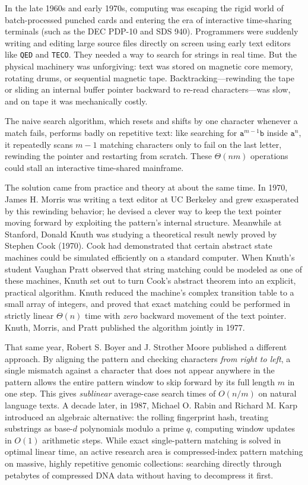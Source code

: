 \begin{historybox}
In the late 1960s and early 1970s, computing was escaping the rigid world of batch-processed punched cards and entering the era of interactive time-sharing terminals (such as the DEC PDP-10 and SDS 940). Programmers were suddenly writing and editing large source files directly on screen using early text editors like \texttt{QED} and \texttt{TECO}. They needed a way to search for strings in real time. But the physical machinery was unforgiving: text was stored on magnetic core memory, rotating drums, or sequential magnetic tape. Backtracking---rewinding the tape or sliding an internal buffer pointer backward to re-read characters---was slow, and on tape it was mechanically costly.

The naive search algorithm, which resets and shifts by one character whenever a match fails, performs badly on repetitive text: like searching for $\texttt{a}^{m-1}\texttt{b}$ inside $\texttt{a}^n$, it repeatedly scans $m-1$ matching characters only to fail on the last letter, rewinding the pointer and restarting from scratch. These $\Theta(n m)$ operations could stall an interactive time-shared mainframe.

The solution came from practice and theory at about the same time. In 1970, James H. Morris was writing a text editor at UC Berkeley and grew exasperated by this rewinding behavior; he devised a clever way to keep the text pointer moving forward by exploiting the pattern's internal structure. Meanwhile at Stanford, Donald Knuth was studying a theoretical result newly proved by Stephen Cook (1970). Cook had demonstrated that certain abstract state machines could be simulated efficiently on a standard computer. When Knuth's student Vaughan Pratt observed that string matching could be modeled as one of these machines, Knuth set out to turn Cook's abstract theorem into an explicit, practical algorithm. Knuth reduced the machine's complex transition table to a small array of integers, and proved that exact matching could be performed in strictly linear $\Theta(n)$ time with \emph{zero} backward movement of the text pointer. Knuth, Morris, and Pratt published the algorithm jointly in 1977.

That same year, Robert S. Boyer and J. Strother Moore published a different approach. By aligning the pattern and checking characters \emph{from right to left}, a single mismatch against a character that does not appear anywhere in the pattern allows the entire pattern window to skip forward by its full length $m$ in one step. This gives \emph{sublinear} average-case search times of $O(n/m)$ on natural language texts. A decade later, in 1987, Michael O. Rabin and Richard M. Karp introduced an algebraic alternative: the rolling fingerprint hash, treating substrings as base-$d$ polynomials modulo a prime $q$, computing window updates in $O(1)$ arithmetic steps. While exact single-pattern matching is solved in optimal linear time, an active research area is compressed-index pattern matching on massive, highly repetitive genomic collections: searching directly through petabytes of compressed DNA data without having to decompress it first.
\end{historybox}

